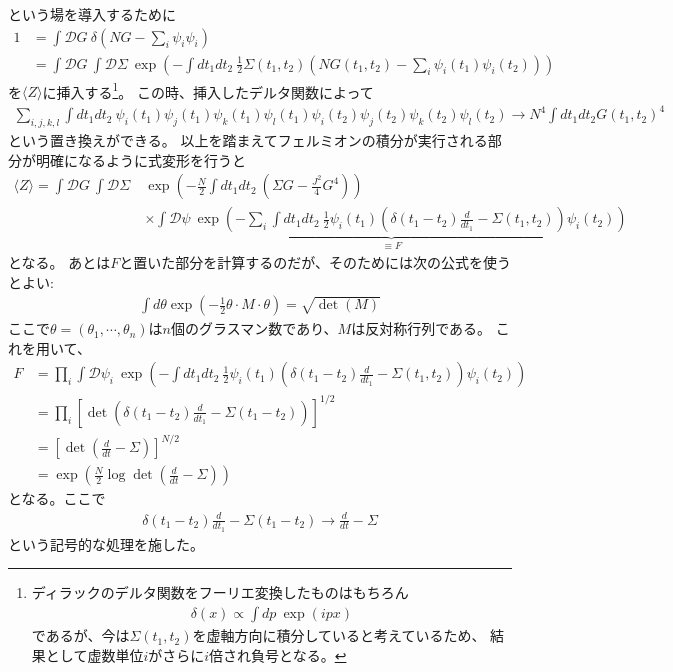 \documentclass[a4]{ltjsarticle}
\newcommand{\deriv}{\frac{d}{dt}}
\newcommand{\pathint}[1]{\int \mathcal{D}#1 \ }
\newcommand{\average}[1]{\langle #1 \rangle}
\begin{document}
	という場を導入するために
	\begin{align}
	1 &= \pathint{G}\delta\left(NG - \sum_i\psi_i\psi_i\right)\nonumber\\
	  &= \pathint{G}\pathint{\Sigma}\exp\left(
	  		-\int dt_1dt_2\ \frac{1}{2}\Sigma(t_1, t_2)\left(
	  		NG(t_1, t_2) - \sum_i\psi_i(t_1)\psi_i(t_2)\right)
	  	\right)
	\end{align}
	を$\average{Z}$に挿入する\footnote{ディラックのデルタ関数をフーリエ変換したものはもちろん
	\begin{align}
	\delta(x) \propto \int dp\ \exp(ipx)
	\end{align}であるが、今は$\Sigma(t_1, t_2)$を虚軸方向に積分していると考えているため、
	結果として虚数単位$i$がさらに$i$倍され負号となる。}。
	この時、挿入したデルタ関数によって
	\begin{align}
	\sum_{i,j,k,l}\int dt_1dt_2\ 
	\psi_i(t_1)\psi_j(t_1)\psi_k(t_1)\psi_l(t_1)
	\psi_i(t_2)\psi_j(t_2)\psi_k(t_2)\psi_l(t_2)
	\to N^4\int dt_1 dt_2 G(t_1, t_2)^4
	\end{align}
	という置き換えができる。
	以上を踏まえてフェルミオンの積分が実行される部分が明確になるように式変形を行うと
	\begin{align}
	\average{Z} = \pathint{G}\pathint{\Sigma}&\exp\left(
	-\frac{N}{2}\int dt_1dt_2\ \left(\Sigma G - \frac{J^2}{4}G^4\right)
	\right)\nonumber\\
	&\times\underbrace{\pathint{\psi}\exp\left(
	-\sum_i\int dt_1dt_2\ \frac{1}{2}\psi_i(t_1)\left(
	\delta(t_1 - t_2)\frac{d}{dt_1} - \Sigma(t_1, t_2)
	\right)\psi_i(t_2)
	\right)}_{\equiv F}
	\end{align}
	となる。
	あとは$F$と置いた部分を計算するのだが、そのためには次の公式を使うとよい:
	\begin{align}
	\int d\theta \exp\left(-\frac{1}{2}\theta\cdot M\cdot\theta\right) = \sqrt{\det(M)}
	\end{align}
	ここで$\theta = (\theta_1, \cdots, \theta_n)$は$n$個のグラスマン数であり、$M$は反対称行列である。
	これを用いて、
	\begin{align}
	F &= \prod_i \pathint{\psi_i} \exp\left(
	-\int dt_1dt_2\ \frac{1}{2}\psi_i(t_1)\left(
	\delta(t_1 - t_2)\frac{d}{dt_1} - \Sigma(t_1, t_2)
	\right)\psi_i(t_2)\right)\nonumber\\
	&= \prod_i \left[
	\det\left(\delta(t_1 - t_2)\frac{d}{dt_1} - \Sigma(t_1 - t_2)\right)
	\right]^{1/2}\nonumber\\
	&= \left[\det\left(\deriv - \Sigma\right)\right]^{N/2}\nonumber\\
	&= \exp\left(\frac{N}{2}\log\det\left(\deriv - \Sigma\right)\right)
	\end{align}
	となる。ここで
	\begin{align}
	\delta(t_1 - t_2)\frac{d}{dt_1} - \Sigma(t_1 - t_2) \to \deriv - \Sigma
	\end{align}
	という記号的な処理を施した。
	
\end{document}

